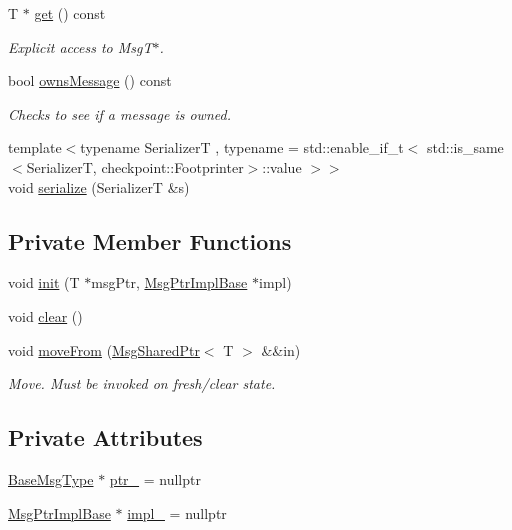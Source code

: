 \begin{DoxyCompactItemize}
T $\ast$ \hyperlink{structvt_1_1messaging_1_1_msg_shared_ptr_a6e6e25e087e662d9171fa20b5092efdd}{get} () const
\begin{DoxyCompactList}\small\item\em Explicit access to Msg\+T$\ast$. \end{DoxyCompactList}\item 
bool \hyperlink{structvt_1_1messaging_1_1_msg_shared_ptr_aea0124e8c6c53e91f3239a8ecf3cdca8}{owns\+Message} () const
\begin{DoxyCompactList}\small\item\em Checks to see if a message is owned. \end{DoxyCompactList}\item 
{\footnotesize template$<$typename SerializerT , typename  = std\+::enable\+\_\+if\+\_\+t$<$      std\+::is\+\_\+same$<$\+Serializer\+T, checkpoint\+::\+Footprinter$>$\+::value    $>$$>$ }\\void \hyperlink{structvt_1_1messaging_1_1_msg_shared_ptr_a604694c988590bdb3a35e403c677cba2}{serialize} (SerializerT \&s)
\end{DoxyCompactItemize}
\subsection*{Private Member Functions}
\begin{DoxyCompactItemize}
\item 
void \hyperlink{structvt_1_1messaging_1_1_msg_shared_ptr_a7117c1a8364c3267d4694b79a2f5cc6b}{init} (T $\ast$msg\+Ptr, \hyperlink{structvt_1_1messaging_1_1_msg_ptr_impl_base}{Msg\+Ptr\+Impl\+Base} $\ast$impl)
\item 
void \hyperlink{structvt_1_1messaging_1_1_msg_shared_ptr_ace4439c8585f3d3c50b861570db07d99}{clear} ()
\item 
void \hyperlink{structvt_1_1messaging_1_1_msg_shared_ptr_a351f61999bc2f15ec3027fcb76c9a942}{move\+From} (\hyperlink{structvt_1_1messaging_1_1_msg_shared_ptr}{Msg\+Shared\+Ptr}$<$ T $>$ \&\&in)
\begin{DoxyCompactList}\small\item\em Move. Must be invoked on fresh/clear state. \end{DoxyCompactList}\end{DoxyCompactItemize}
\subsection*{Private Attributes}
\begin{DoxyCompactItemize}
\item 
\hyperlink{structvt_1_1messaging_1_1_msg_shared_ptr_a778cb9ec8919e4a309d28ed345ac318d}{Base\+Msg\+Type} $\ast$ \hyperlink{structvt_1_1messaging_1_1_msg_shared_ptr_aac5218a8b39004946a523ac4a729a3da}{ptr\+\_\+} = nullptr
\item 
\hyperlink{structvt_1_1messaging_1_1_msg_ptr_impl_base}{Msg\+Ptr\+Impl\+Base} $\ast$ \hyperlink{structvt_1_1messaging_1_1_msg_shared_ptr_aa0cf96203c13d77d691888c852bc333e}{impl\+\_\+} = nullptr
\end{DoxyCompactItemize}
